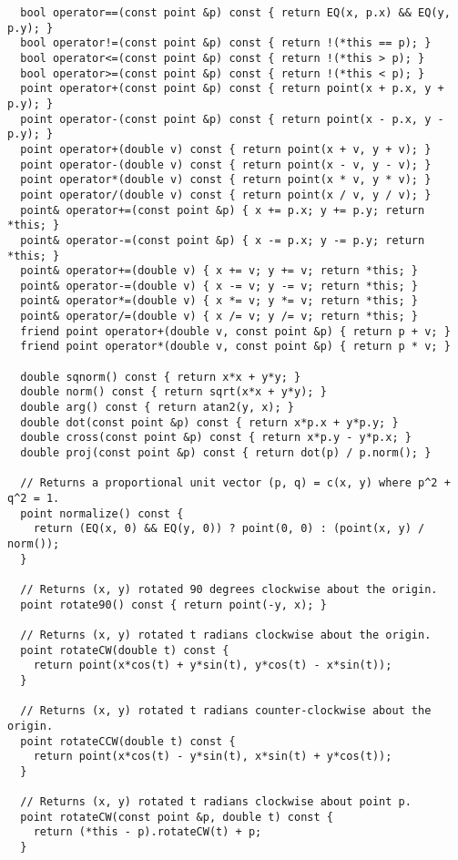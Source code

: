 \begin{lstlisting}
  bool operator==(const point &p) const { return EQ(x, p.x) && EQ(y, p.y); }
  bool operator!=(const point &p) const { return !(*this == p); }
  bool operator<=(const point &p) const { return !(*this > p); }
  bool operator>=(const point &p) const { return !(*this < p); }
  point operator+(const point &p) const { return point(x + p.x, y + p.y); }
  point operator-(const point &p) const { return point(x - p.x, y - p.y); }
  point operator+(double v) const { return point(x + v, y + v); }
  point operator-(double v) const { return point(x - v, y - v); }
  point operator*(double v) const { return point(x * v, y * v); }
  point operator/(double v) const { return point(x / v, y / v); }
  point& operator+=(const point &p) { x += p.x; y += p.y; return *this; }
  point& operator-=(const point &p) { x -= p.x; y -= p.y; return *this; }
  point& operator+=(double v) { x += v; y += v; return *this; }
  point& operator-=(double v) { x -= v; y -= v; return *this; }
  point& operator*=(double v) { x *= v; y *= v; return *this; }
  point& operator/=(double v) { x /= v; y /= v; return *this; }
  friend point operator+(double v, const point &p) { return p + v; }
  friend point operator*(double v, const point &p) { return p * v; }

  double sqnorm() const { return x*x + y*y; }
  double norm() const { return sqrt(x*x + y*y); }
  double arg() const { return atan2(y, x); }
  double dot(const point &p) const { return x*p.x + y*p.y; }
  double cross(const point &p) const { return x*p.y - y*p.x; }
  double proj(const point &p) const { return dot(p) / p.norm(); }

  // Returns a proportional unit vector (p, q) = c(x, y) where p^2 + q^2 = 1.
  point normalize() const {
    return (EQ(x, 0) && EQ(y, 0)) ? point(0, 0) : (point(x, y) / norm());
  }

  // Returns (x, y) rotated 90 degrees clockwise about the origin.
  point rotate90() const { return point(-y, x); }

  // Returns (x, y) rotated t radians clockwise about the origin.
  point rotateCW(double t) const {
    return point(x*cos(t) + y*sin(t), y*cos(t) - x*sin(t));
  }

  // Returns (x, y) rotated t radians counter-clockwise about the origin.
  point rotateCCW(double t) const {
    return point(x*cos(t) - y*sin(t), x*sin(t) + y*cos(t));
  }

  // Returns (x, y) rotated t radians clockwise about point p.
  point rotateCW(const point &p, double t) const {
    return (*this - p).rotateCW(t) + p;
  }


\end{lstlisting}
